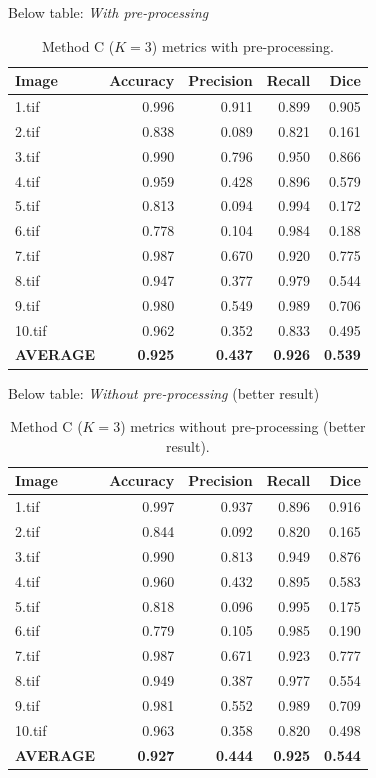 Below table: \textit{With pre-processing}

\begin{table}[t]
  \centering
  \caption{Method C (\(K=3\)) metrics with pre-processing.}
  \label{tab:method-c-with-preprocessing}
  \begin{tabularx}{\linewidth}{@{}lrrrr@{}}
    \toprule
    Image & Accuracy & Precision & Recall & Dice \\
    \midrule
    1.tif  & 0.996 & 0.911 & 0.899 & 0.905 \\
    2.tif  & 0.838 & 0.089 & 0.821 & 0.161 \\
    3.tif  & 0.990 & 0.796 & 0.950 & 0.866 \\
    4.tif  & 0.959 & 0.428 & 0.896 & 0.579 \\
    5.tif  & 0.813 & 0.094 & 0.994 & 0.172 \\
    6.tif  & 0.778 & 0.104 & 0.984 & 0.188 \\
    7.tif  & 0.987 & 0.670 & 0.920 & 0.775 \\
    8.tif  & 0.947 & 0.377 & 0.979 & 0.544 \\
    9.tif  & 0.980 & 0.549 & 0.989 & 0.706 \\
    10.tif & 0.962 & 0.352 & 0.833 & 0.495 \\
    \midrule
    \textbf{AVERAGE} & \textbf{0.925} & \textbf{0.437} & \textbf{0.926} & \textbf{0.539} \\
    \bottomrule
  \end{tabularx}
\end{table}

Below table: \textit{Without pre-processing} (better result)

\begin{table}[t]
  \centering
  \caption{Method C (\(K=3\)) metrics without pre-processing (better result).}
  \label{tab:method-c-results}
  \begin{tabularx}{\linewidth}{@{}lrrrr@{}}
    \toprule
    Image & Accuracy & Precision & Recall & Dice \\
    \midrule
    1.tif  & 0.997 & 0.937 & 0.896 & 0.916 \\
    2.tif  & 0.844 & 0.092 & 0.820 & 0.165 \\
    3.tif  & 0.990 & 0.813 & 0.949 & 0.876 \\
    4.tif  & 0.960 & 0.432 & 0.895 & 0.583 \\
    5.tif  & 0.818 & 0.096 & 0.995 & 0.175 \\
    6.tif  & 0.779 & 0.105 & 0.985 & 0.190 \\
    7.tif  & 0.987 & 0.671 & 0.923 & 0.777 \\
    8.tif  & 0.949 & 0.387 & 0.977 & 0.554 \\
    9.tif  & 0.981 & 0.552 & 0.989 & 0.709 \\
    10.tif & 0.963 & 0.358 & 0.820 & 0.498 \\
    \midrule
    \textbf{AVERAGE} & \textbf{0.927} & \textbf{0.444} & \textbf{0.925} & \textbf{0.544} \\
    \bottomrule
  \end{tabularx}
\end{table}

